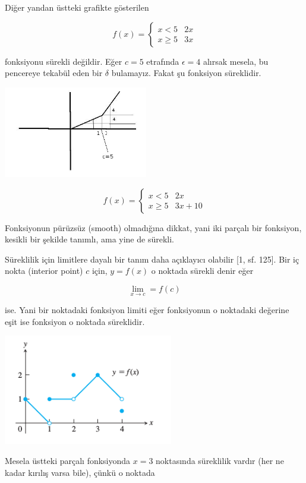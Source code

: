\documentclass[12pt,fleqn]{article}\usepackage{../../common}
\begin{document}
Diğer yandan üstteki grafikte gösterilen 

$$ 
f(x) = 
\left\{ \begin{array}{ll}
x < 5 & 2x \\
x \ge 5 & 3x
\end{array} \right.
$$

fonksiyonu sürekli değildir. Eğer $c=5$ etrafında $\epsilon = 4$ alırsak mesela,
bu pencereye tekabül eden bir $\delta$ bulamayız. Fakat şu fonksiyon süreklidir.

\includegraphics[height=4cm]{2_3.png}

$$ 
f(x) = 
\left\{ \begin{array}{ll}
x < 5 & 2x \\
x \ge 5 & 3x + 10
\end{array} \right.
$$

Fonksiyonun pürüzsüz (smooth) olmadığına dikkat, yani iki parçalı bir fonksiyon,
kesikli bir şekilde tanımlı, ama yine de sürekli.

Süreklilik için limitlere dayalı bir tanım daha açıklayıcı olabilir [1,
sf. 125]. Bir iç nokta (interior point) $c$ için, $y=f(x)$ o noktada
sürekli denir eğer

$$ \lim_{x \to c} = f(c)$$

ise. Yani bir noktadaki fonksiyon limiti eğer fonksiyonun o noktadaki
değerine eşit ise fonksiyon o noktada süreklidir.

\includegraphics[width=20em]{2_6.png}

Mesela üstteki parçalı fonksiyonda $x=3$ noktasında süreklilik vardır (her
ne kadar kırılış varsa bile), çünkü o noktada
\end{document}

